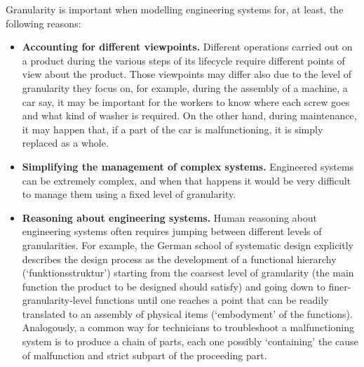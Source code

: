 \documentclass[
]{ceurart}
\begin{document}
Granularity is important when modelling engineering systems for, at least, the following reasons:
\begin{itemize}
    \item \textbf{Accounting for different viewpoints.} Different operations carried out on a product during the various steps of its lifecycle require different points of view about the product. Those viewpoints may differ also due to the level of granularity they focus on, for example, during the assembly of a machine, a car say, it may be important for the workers to know where each screw goes and what kind of washer is required. On the other hand, during maintenance, it may happen that, if a part of the car is malfunctioning, it is simply replaced as a whole.%
    \item \textbf{Simplifying the management of complex systems.} Engineered systems can be extremely complex, and when that happens it would be very difficult to manage them using a fixed level of granularity. %
    \item \textbf{Reasoning about engineering systems.} Human reasoning about engineering systems often requires jumping between different levels of granularities. For example, the German school of systematic design \cite{pahl_engineering_2007} explicitly describes the design process as the development of a functional hierarchy (`funktionsstruktur') starting from the coarsest level of granularity (the main function the product to be designed should satisfy) and going down to finer-granularity-level functions until one reaches a point that can be readily translated to an assembly of physical items (`embodyment' of the functions). Analogously, a common way for technicians to troubleshoot a malfunctioning system is to produce a chain of parts, each one possibly `containing' the cause of malfunction and strict subpart of the proceeding part. %

\end{itemize}
\end{document}
